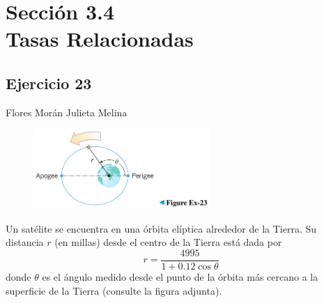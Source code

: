 \documentclass[12pt]{article}
\begin{document}
\section{Sección 3.4 \\ Tasas Relacionadas} 
\subsection{Ejercicio 23} Flores Morán Julieta Melina \\

\begin{figure}[H]
\centering
\includegraphics[width=0.6\textwidth]{../img/img_Lista3/23.png}
\end{figure}
Un satélite se encuentra en una órbita elíptica alrededor de la Tierra. Su distancia $r$ (en millas) desde el centro de la Tierra está dada por
\[
r=\frac{4995}{1+0.12\cos{\theta}}
\]
donde $\theta$ es el ángulo medido desde el punto de la órbita más cercano a la superficie de la Tierra (consulte la figura adjunta).
\end{document}
